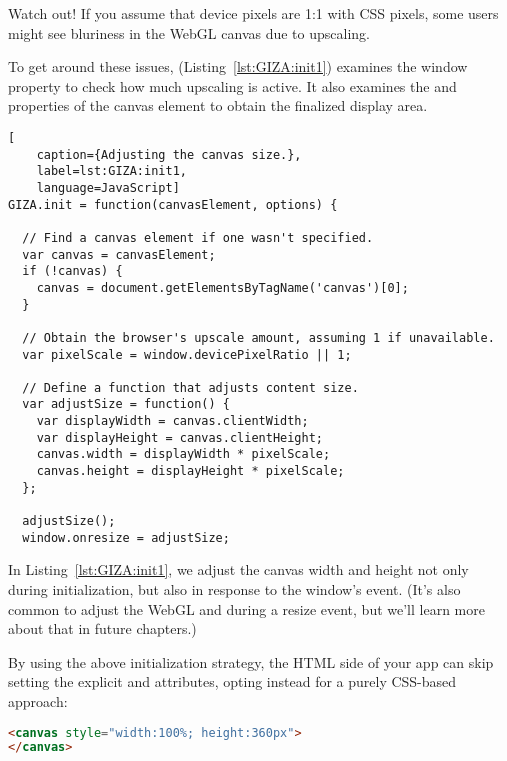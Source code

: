 \begin{sidenote}%
Watch out!  If you assume that device pixels are 1:1 with CSS pixels, some users might see bluriness in the WebGL canvas due to upscaling.
\end{sidenote}

To get around these issues,  (Listing~\ref{lst:GIZA:init1}) examines the \linebreak {} window property to check how much upscaling is active.  It also examines the   and  properties of the canvas element to obtain the finalized display area.

\begin{lstlisting}[
    caption={Adjusting the canvas size.},
    label=lst:GIZA:init1,
    language=JavaScript]
GIZA.init = function(canvasElement, options) {

  // Find a canvas element if one wasn't specified.
  var canvas = canvasElement;
  if (!canvas) {
    canvas = document.getElementsByTagName('canvas')[0];
  }

  // Obtain the browser's upscale amount, assuming 1 if unavailable.
  var pixelScale = window.devicePixelRatio || 1;

  // Define a function that adjusts content size.
  var adjustSize = function() {
    var displayWidth = canvas.clientWidth;
    var displayHeight = canvas.clientHeight;
    canvas.width = displayWidth * pixelScale;
    canvas.height = displayHeight * pixelScale;
  };

  adjustSize();
  window.onresize = adjustSize;
\end{lstlisting} 

In Listing~\ref{lst:GIZA:init1}, we adjust the canvas width and height not only during initialization, but also in response to the window's   event.  (It's also common to adjust the WebGL  and  during a resize event, but we'll learn more about that in future chapters.)

By using the above initialization strategy, the HTML side of your app can skip setting the explicit  and  attributes, opting instead for a purely CSS-based approach:

\begin{lstlisting}[language=HTML]
<canvas style="width:100%; height:360px">
</canvas>
\end{lstlisting}

